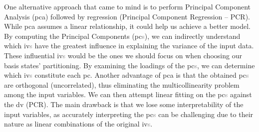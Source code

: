 One alternative approach that came to mind is to perform Principal Component Analysis (\acrshort{pca}) followed by regression (Principal Component Regression – PCR). While \acrshort{pca} assumes a linear relationship, it could help us achieve a better model. By computing the Principal Components (\acrshort{pc}\textcolor{gray}{s}), we can indirectly understand which \acrshort{iv}\textcolor{gray}{s} have the greatest influence in explaining the variance of the input data. These influential \acrshort{iv}\textcolor{gray}{s} would be the ones we should focus on when choosing our basis states' partitioning. By examining the loadings of the \acrshort{pc}\textcolor{gray}{s}, we can determine which \acrshort{iv}\textcolor{gray}{s} constitute each \acrshort{pc}. Another advantage of \acrshort{pca} is that the obtained \acrshort{pc}\textcolor{gray}{s} are orthogonal (uncorrelated), thus eliminating the multicollinearity problem among the input variables. We can then attempt linear fitting on the \acrshort{pc}\textcolor{gray}{s} against the \acrshort{dv} (PCR). The main drawback is that we lose some interpretability of the input variables, as accurately interpreting the \acrshort{pc}\textcolor{gray}{s} can be challenging due to their nature as linear combinations of the original \acrshort{iv}\textcolor{gray}{s}.

